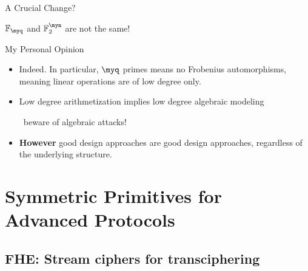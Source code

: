 \documentclass[presentation,aspectratio=1610]{beamer}
\begin{document}
\begin{frame}{A Crucial Change?}
  \begin{center}
    {\large $\F_\myq$ and $\F_2^\myn$ are not the same!}
  \end{center}

  \pause

  \begin{exampleblock}{My Personal Opinion}
    \begin{itemize}
      \setlength\itemsep{0.3cm}
    \item Indeed. \pause In particular, $\myq$ primes means no Frobenius automorphisms, meaning linear operations are of \alert{low degree only}.
      \pause
    \item Low degree arithmetization implies low degree algebraic modeling

      ~\hfill \alert{beware of algebraic attacks!}
      \pause
    \item \textbf{However} good design approaches are good design approaches, regardless of the underlying structure. 
    \end{itemize}
  \end{exampleblock}
\end{frame}


\section{Symmetric Primitives for Advanced Protocols}

\subsection{FHE: Stream ciphers for transciphering}
\end{document}
